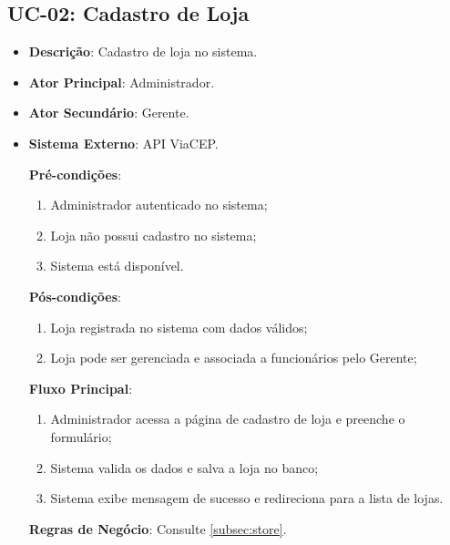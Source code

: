 \subsection{UC-02: Cadastro de Loja}

\begin{itemize}[topsep=1pt, itemsep=0pt]
  \item[]\textbf{Descrição}: Cadastro de loja no sistema.

  \item[]\textbf{Ator Principal}: Administrador.
  \item[]\textbf{Ator Secundário}: Gerente.

  \item[]\textbf{Sistema Externo}: API ViaCEP.

  \textbf{Pré-condições}:
  \begin{enumerate}
    \item Administrador autenticado no sistema;
    \item Loja não possui cadastro no sistema;
    \item Sistema está disponível.
  \end{enumerate}

  \textbf{Pós-condições}:
  \begin{enumerate}
    \item Loja registrada no sistema com dados válidos;
    \item Loja pode ser gerenciada e associada a funcionários pelo Gerente;
  \end{enumerate}

  \textbf{Fluxo Principal}:
  \begin{enumerate}
    \item Administrador acessa a página de cadastro de loja e preenche o formulário;
    \item Sistema valida os dados e salva a loja no banco;
    \item Sistema exibe mensagem de sucesso e redireciona para a lista de lojas.
  \end{enumerate}

  \textbf{Regras de Negócio}:
  Consulte \ref{subsec:store}.

\end{itemize}
